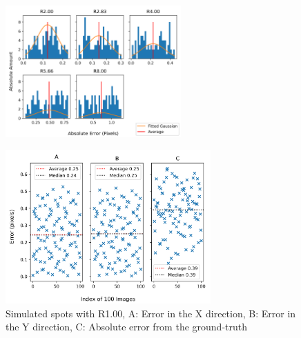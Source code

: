 \documentclass[aps,pra,a4paper,nofootinbib,onecolumn,tightenlines,longbibliography,12pt,amsfonts,amssymb,amsmath,floatfix]{revtex4-2} %
\begin{document}
  \begin{figure}[H]
    \begin{center}
      \includegraphics[width=0.6\textwidth]{project_pics/noise_cen_scatter_7.png}
    \end{center}
    \caption{}
    \label{fig:box_7_noise}
  \end{figure}

  \begin{figure}[H]
      \begin{center}
        \includegraphics[width=0.7\textwidth]{project_pics/single_test.png}
      \end{center}
      \caption{Simulated spots with R1.00, A: Error in the X direction, B: Error in the Y direction, C: Absolute error from the ground-truth}
      \label{fig:single_test}
    \end{figure}
\end{document}
